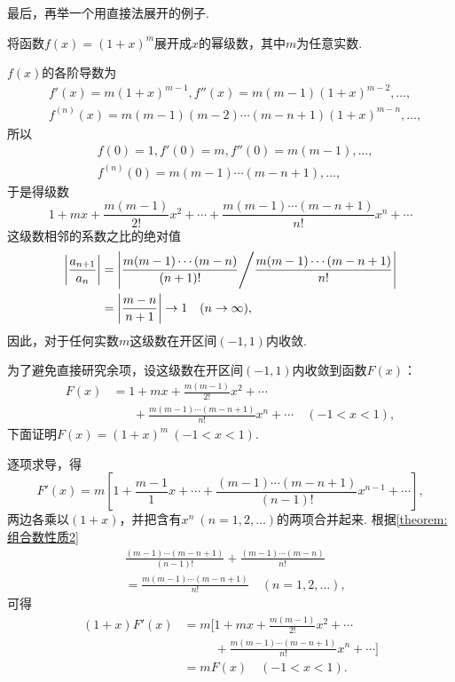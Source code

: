 最后，再举一个用直接法展开的例子.

\begin{example}
将函数\(f(x) = (1+x)^m\)展开成\(x\)的幂级数，其中\(m\)为任意实数.
\begin{solution}
\(f(x)\)的各阶导数为\[
\begin{split}
&f'(x) = m (1+x)^{m-1},
f''(x) = m(m-1) (1+x)^{m-2},
\dotsc, \\
&f^{(n)}(x) = m(m-1)(m-2)\dotsm(m-n+1) (1+x)^{m-n},
\dotsc,
\end{split}
\]所以\[
\begin{split}
&f(0) = 1,
f'(0) = m,
f''(0) = m(m-1),
\dotsc, \\
&f^{(n)}(0) = m(m-1)\dotsm(m-n+1),\dotsc,
\end{split}
\]于是得级数\[
1+mx+\frac{m(m-1)}{2!}x^2+\dotsb+\frac{m(m-1)\dotsm(m-n+1)}{n!}x^n+\dotsb
\]这级数相邻的系数之比的绝对值\[
\begin{split}
\abs{\frac{a_{n+1}}{a_n}}
&= \abs{ \frac{m(m-1)\dotsm(m-n)}{(n+1)!} \Bigg/ \frac{m(m-1)\dotsm(m-n+1)}{n!} } \\
&= \abs{ \frac{m-n}{n+1} }
\to 1 \quad(n\to\infty),
\end{split}
\]因此，对于任何实数\(m\)这级数在开区间\((-1,1)\)内收敛.

为了避免直接研究余项，设这级数在开区间\((-1,1)\)内收敛到函数\(F(x)\)：\[
\begin{split}
F(x) &= 1+mx+\frac{m(m-1)}{2!}x^2+\dotsb \\
    &\hspace{20pt}+\frac{m(m-1)\dotsm(m-n+1)}{n!}x^n+\dotsb
    \quad(-1<x<1),
\end{split}
\]下面证明\(F(x) = (1+x)^m\ (-1<x<1)\).

逐项求导，得\[
F'(x) = m \left[
    1+\frac{m-1}{1}x+\dotsb+\frac{(m-1)\dotsm(m-n+1)}{(n-1)!}x^{n-1}+\dotsb
\right],
\]两边各乘以\((1+x)\)，并把含有\(x^n\ (n=1,2,\dotsc)\)的两项合并起来.
根据\cref{theorem:组合数性质2} \[
\begin{split}
&\frac{(m-1)\dotsm(m-n+1)}{(n-1)!}
	+ \frac{(m-1)\dotsm(m-n)}{n!} \\
&= \frac{m(m-1)\dotsm(m-n+1)}{n!}
	\quad(n=1,2,\dotsc),
\end{split}
\]可得\[
\begin{split}
(1+x) F'(x)
&= m \Biggl[
1+mx+\frac{m(m-1)}{2!}x^2+\dotsb \\
&\hspace{30pt} +\frac{m(m-1)\dotsm(m-n+1)}{n!}x^n+\dotsb
\Biggr] \\
&= m F(x)
\quad(-1<x<1).
\end{split}
\]


\end{solution}
\end{example}
